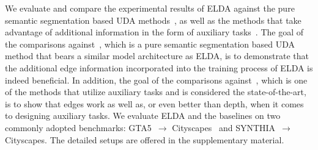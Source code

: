 \documentclass{bmvc2k}
\begin{document}
We evaluate and compare the experimental results of ELDA against the pure semantic segmentation based UDA methods~\cite{mei2020instance,tranheden2020dacs,zhang2021prototypical,zhang2019category,zheng2020rectifying,zou2018domain,yang2020fda,lv2020pit}, as well as the methods that take advantage of additional information in the form of auxiliary tasks~\cite{vu2019dada,wang2021domain,Lee2019SPIGANPA,Chen_2019_GIOada,Saha_2021_CVPR_CTRL,guizilini2021geometric}.
The goal of the comparisons against~\cite{tranheden2020dacs}, which is a pure semantic segmentation based UDA method that bears a similar model architecture as ELDA, is to demonstrate that the additional edge information incorporated into the training process of ELDA is indeed beneficial. In addition, the goal of the comparisons against~\cite{wang2021domain}, which is one of the methods that utilize auxiliary tasks and is considered the state-of-the-art, is to show that edges work as well as, or even better than depth, when it comes to designing auxiliary tasks.
We evaluate ELDA and the baselines on two commonly adopted benchmarks: GTA5~\cite{richter2016playing}$\to$ Cityscapes~\cite{cordts2016cityscapes} and SYNTHIA~\cite{Ros_2016_CVPR}$\to$ Cityscapes. 
The detailed setups are offered in the supplementary material.
\end{document}
